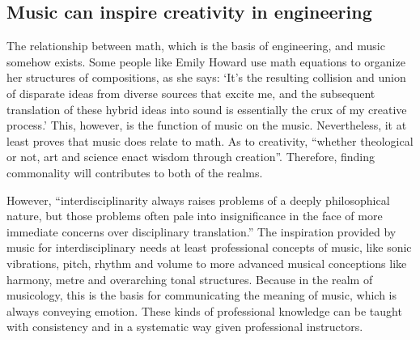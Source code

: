 \subsection{Music can inspire creativity in engineering}
The relationship between math, which is the basis of engineering, and music somehow exists. Some people like Emily Howard use math equations to organize her structures of compositions, as she says: ‘It’s the resulting collision and union of disparate ideas from diverse sources that excite me, and the subsequent translation of these hybrid ideas into sound is essentially the crux of my creative process.’ This, however, is the function of music on the music. Nevertheless, it at least proves that music does relate to math. As to creativity, “whether theological or not, art and science enact wisdom through creation”. Therefore, finding commonality will contributes to both of the realms.\par
However, “interdisciplinarity always raises problems of a deeply philosophical nature, but those problems often pale into insignificance in the face of more immediate concerns over disciplinary translation.” The inspiration provided by music for interdisciplinary needs at least professional concepts of music, like sonic vibrations, pitch, rhythm and volume to more advanced musical conceptions like harmony, metre and overarching tonal structures. Because in the realm of musicology, this is the basis for communicating the meaning of music, which is always conveying emotion. These kinds of professional knowledge can be taught with consistency and in a systematic way given professional instructors.\par
